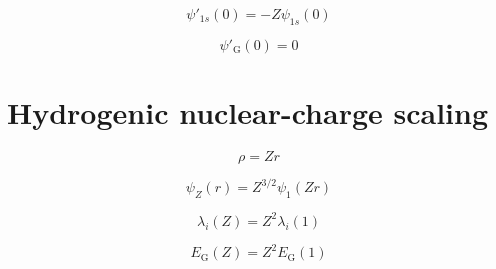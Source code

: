 \begin{equation}
    \psi'_{1s}(0)=-Z\psi_{1s}(0)
\end{equation}

\begin{equation}
    \psi'_{\mathrm G}(0)=0
\end{equation}



\section{Hydrogenic nuclear-charge scaling}

\begin{equation}
    \rho=Zr
    \label{eq:scaled_coordinate}
\end{equation}

\begin{equation}
    \psi_Z(r)=Z^{3/2}\psi_1(Zr)
    \label{eq:wavefunction_scaling}
\end{equation}

\begin{equation}
    \lambda_i(Z)=Z^2\lambda_i(1)
    \label{eq:exponent_scaling}
\end{equation}

\begin{equation}
    E_{\mathrm G}(Z)=Z^2E_{\mathrm G}(1)
    \label{eq:gaussian_energy_scaling}
\end{equation}

